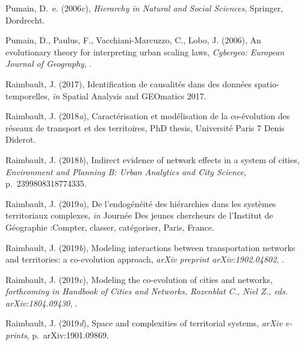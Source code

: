 \documentclass[11pt]{article}
\begin{document}
\begin{thebibliography}{xx}
Pumain, D.~e. (2006{\em c}), {\em Hierarchy in Natural and Social Sciences},
  Springer, Dordrecht.

Pumain, D., Paulus, F., Vacchiani-Marcuzzo, C., Lobo, J. (2006), An
  evolutionary theory for interpreting urban scaling laws, {\em Cybergeo:
  European Journal of Geography}, .

Raimbault, J. (2017), Identification de causalit{\'e}s dans des donn{\'e}es
  spatio-temporelles, {\em in} Spatial Analysis and GEOmatics 2017.

Raimbault, J. (2018{\em a}), Caract{\'e}risation et mod{\'e}lisation de la
  co-{\'e}volution des r{\'e}seaux de transport et des territoires, PhD thesis,
  Universit{\'e} Paris 7 Denis Diderot.

Raimbault, J. (2018{\em b}), Indirect evidence of network effects in a system
  of cities, {\em Environment and Planning B: Urban Analytics and City
  Science}, p.~2399808318774335.

Raimbault, J. (2019{\em a}), {De l'endog{\'e}n{\'e}it{\'e} des hi{\'e}rarchies
  dans les syst{\`e}mes territoriaux complexes}, {\em in} {Journ{\'e}e Des
  jeunes chercheurs de l'Institut de G{\'e}ographie :Compter, classer,
  cat{\'e}goriser}, Paris, France.
\newline{}

Raimbault, J. (2019{\em b}), Modeling interactions between transportation
  networks and territories: a co-evolution approach, {\em arXiv preprint
  arXiv:1902.04802}, .

Raimbault, J. (2019{\em c}), Modeling the co-evolution of cities and networks,
  {\em forthcoming in Handbook of Cities and Networks, Rozenblat C., Niel Z.,
  eds. arXiv:1804.09430}, .

{Raimbault}, J. (2019{\em d}), {Space and complexities of territorial systems},
  {\em arXiv e-prints}, p.~arXiv:1901.09869.


\end{thebibliography}
\end{document}
